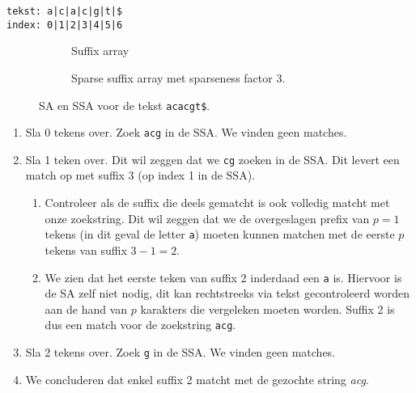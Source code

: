 \begin{center}
    \texttt{tekst: a|c|a|c|g|t|\$\\index: 0|1|2|3|4|5|6}
\end{center}
\begin{figure}[H]
    \hfill
    \begin{subfigure}[t]{0.45\linewidth}
        \centering
        \caption{Suffix array}
    \end{subfigure}
    \hfill
    \begin{subfigure}[t]{0.45\linewidth}
        \centering
        \caption{Sparse suffix array met sparseness factor 3.}
    \end{subfigure}
    \hfill
    \caption{SA en SSA voor de tekst \texttt{acacgt\$}.}
    \label{fig:sparse_sa}
\end{figure}

\begin{enumerate}
    \item Sla 0 tekens over.
    Zoek \texttt{acg} in de SSA\@.
    We vinden geen matches.
    \item Sla 1 teken over.
    Dit wil zeggen dat we \texttt{cg} zoeken in de SSA\@.
    Dit levert een match op met suffix 3 (op index 1 in de SSA).
    \begin{enumerate}
        \item Controleer als de suffix die deels gematcht is ook volledig matcht met onze zoekstring.
        Dit wil zeggen dat we de overgeslagen prefix van $p = 1$ tekens (in dit geval de letter \texttt{a}) moeten kunnen matchen met de eerste $p$ tekens van suffix $3 - 1 = 2$.
        \item We zien dat het eerste teken van suffix 2 inderdaad een \texttt{a} is.
        Hiervoor is de SA zelf niet nodig, dit kan rechtstreeks via tekst gecontroleerd worden aan de hand van $p$ karakters die vergeleken moeten worden.
        Suffix 2 is dus een match voor de zoekstring \texttt{acg}.
    \end{enumerate}
    \item Sla 2 tekens over.
    Zoek \texttt{g} in de SSA\@.
    We vinden geen matches.
    \item We concluderen dat enkel suffix 2 matcht met de gezochte string \textit{acg}.
\end{enumerate}

